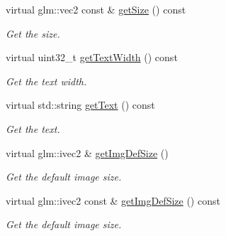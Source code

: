 \begin{DoxyCompactItemize}
virtual glm\+::vec2 const  \& \hyperlink{class_a_base_u_i_adccd2d278366f6fe12db1f3a55baafd2}{get\+Size} () const
\begin{DoxyCompactList}\small\item\em Get the size. \end{DoxyCompactList}\item 
virtual uint32\+\_\+t \hyperlink{class_a_base_u_i_a3f0c35baa16ea53b2d43032e48a792e8}{get\+Text\+Width} () const
\begin{DoxyCompactList}\small\item\em Get the text width. \end{DoxyCompactList}\item 
virtual std\+::string \hyperlink{class_a_base_u_i_afcf23c37d38d3a9038d8491159029238}{get\+Text} () const
\begin{DoxyCompactList}\small\item\em Get the text. \end{DoxyCompactList}\item 
virtual glm\+::ivec2 \& \hyperlink{class_a_base_u_i_a92534c962d9421fe2a325dd29eed1455}{get\+Img\+Def\+Size} ()
\begin{DoxyCompactList}\small\item\em Get the default image size. \end{DoxyCompactList}\item 
virtual glm\+::ivec2 const  \& \hyperlink{class_a_base_u_i_aeb6aad01bcd740bf18893cc7d3478cf1}{get\+Img\+Def\+Size} () const
\begin{DoxyCompactList}\small\item\em Get the default image size. \end{DoxyCompactList}\end{DoxyCompactItemize}
